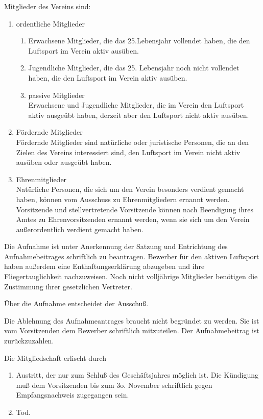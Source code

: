 \documentclass[11pt,a4paper,parskip=half]{scrartcl}
\begin{document}
\begin{contract}
\begin{multicols}{2}
		Mitglieder des Vereins sind:
		\begin{enumerate}
			\item ordentliche Mitglieder
		\begin{enumerate}
			\item Erwachsene Mitglieder, die das 25.Lebensjahr
			vollendet haben, die den Luftsport im Verein aktiv
			ausüben.
			\item Jugendliche Mitglieder, die das 25. Lebensjahr
			noch nicht vollendet haben, die den Luftsport im
			Verein aktiv ausüben.
			\item{passive Mitglieder}\\ Erwachsene und Jugendliche Mitglieder, die im
			Verein den Luftsport aktiv ausgeübt haben,
			derzeit aber den Luftsport nicht aktiv ausüben.
		\end{enumerate}
	\item{Fördernde Mitglieder}\\ Fördernde Mitglieder sind natürliche oder juristische Personen, die an den Zielen des
	Vereins interessiert sind, den Luftsport im Verein nicht aktiv ausüben oder ausgeübt haben.
		
	
		\item{Ehrenmitglieder}\\
		Natürliche Personen, die sich um den Verein
		besonders verdient gemacht haben, können vom
		Ausschuss zu Ehrenmitgliedern ernannt werden.
		Vorsitzende und stellvertretende Vorsitzende
		können nach Beendigung ihres Amtes zu
		Ehrenvorsitzenden ernannt werden, wenn sie sich
		um den Verein außerordentlich verdient gemacht
		haben.
	\end{enumerate}
		
		Die Aufnahme ist unter Anerkennung der
		Satzung und Entrichtung des Aufnahmebeitrages
		schriftlich zu beantragen. Bewerber für den aktiven
		Luftsport haben außerdem eine
		Enthaftungserklärung abzugeben und ihre
		Fliegertauglichkeit nachzuweisen. Noch nicht
		volljährige Mitglieder benötigen die Zustimmung
		ihrer gesetzlichen Vertreter.
		
		Über die Aufnahme entscheidet der Ausschuß.
		
		Die Ablehnung des Aufnahmeantrages braucht
		nicht begründet zu werden. Sie ist vom
		Vorsitzenden dem Bewerber schriftlich mitzuteilen.
		Der Aufnahmebeitrag ist zurückzuzahlen.
		
		Die Mitgliedschaft erlischt durch
		\begin{enumerate}[label=\alph*)]
		\item Austritt, der nur zum Schluß des Geschäftsjahres
		möglich ist. Die Kündigung muß dem Vorsitzenden
		bis zum 3o. November schriftlich gegen
		Empfangsnachweis zugegangen sein.
		\item Tod.
		

\end{enumerate}
\end{multicols}
\end{contract}
\end{document}
